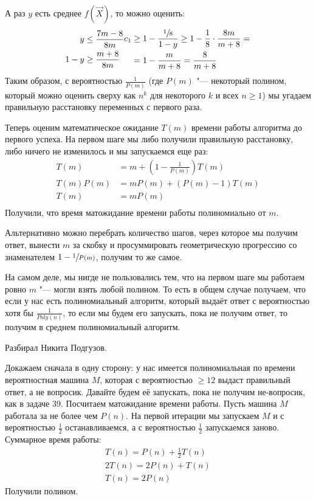 	А раз $y$ есть среднее $f(\vec X)$, то можно оценить:
	\begin{gather*}
		\begin{aligned}
			y &\le \frac{7m-8}{8m} \\
			1 - y &\ge \frac{m+8}{8m} \\
		\end{aligned}
		\begin{aligned}
			c_1
				&\ge 1 - \frac{\sfrac 18}{1 - y}
				 \ge 1 - \frac 1 8 \cdot \frac{8m}{m+8} = \\
				&= 1 - \frac{m}{m+8}
				 = \frac{8}{m+8}
		\end{aligned}
	\end{gather*}	
	Таким образом, с вероятностью $\frac{1}{P(m)}$ (где $P(m)$ "--- некоторый полином,
	который можно оценить сверху как $n^k$ для некоторого $k$ и всех $n \ge 1$)
	мы угадаем правильную расстановку переменных с первого раза.

	Теперь оценим математическое ожидание $T(m)$ времени работы алгоритма до первого успеха.
	На первом шаге мы либо получили правильную расстановку, либо ничего не изменилось и мы запускаемся еще раз:
	\begin{align*}
		T(m) &= m + \left(1 - \frac{1}{P(m)}\right) T(m) \\
		T(m)P(m) &= mP(m) + (P(m)-1)T(m) \\
		T(m) &= mP(m) \\
	\end{align*}
	Получили, что время матожидание времени работы полиномиально от $m$.
	\begin{Rem}
		Альтернативно можно перебрать количество шагов, через которое мы получим ответ,
		вынести $m$ за скобку и просуммировать геометрическую прогрессию со знаменателем $1-\sfrac{1}{P(m)}$, получим то же самое.
	\end{Rem}
	\begin{assertion}
		На самом деле, мы нигде не пользовались тем, что на первом шаге мы работаем ровно $m$ "--- могли
		взять любой полином.
		То есть в общем случае получаем, что если у нас есть полиномиальный алгоритм, который
		выдаёт ответ с вероятностью хотя бы $\frac{1}{Poly(n)}$, то если мы будем его запускать,
		пока не получим ответ, то получим в среднем полиномиальный алгоритм.
	\end{assertion}

	Разбирал Никита Подгузов.

    Докажаем сначала в одну сторону: у нас имеется полиномиальная по времени
    вероятностная машина $M$, которая с вероятностью $\ge 12$ выдаст правильный ответ, а не вопросик.
    Давайте будем её запускать, пока не получим не-вопросик, как в задаче 39.
    Посчитаем матожидание времени работы.
    Пусть машина $M$ работала за не более чем $P(n)$.
    На первой итерации мы запускаем $M$ и с вероятностью $\frac 12$ останавливаемся, а с вероятностью $\frac 12$ запускаемся заново.
    Суммарное время работы:
    \begin{align*}
    	T(n) = P(n) + \frac12 T(n) \\
    	2T(n) = 2P(n) + T(n) \\
    	T(n) = 2P(n)
	\end{align*}
	Получили полином.

